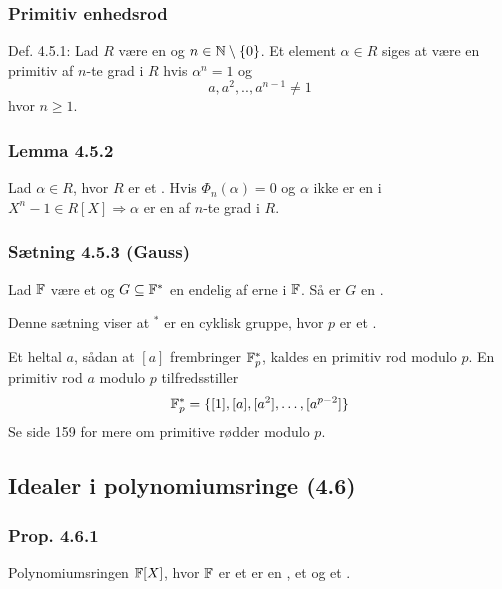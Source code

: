 \subsubsection{Primitiv enhedsrod}
\label{Primitiv enhedsrod}
Def. 4.5.1: Lad $R$ være en  og $n \in \mathbb{N}\setminus \{ 0 \}$. Et
element $\alpha \in R$ siges at være en primitiv  af $n$-te grad i $R$ hvis
$\alpha^n = 1$ og
\begin{equation*}
  a,a^2,..,a^{n-1} \neq 1
\end{equation*}
hvor $n \geq 1$.

\subsubsection{Lemma 4.5.2}
\label{Lemma 4.5.2}
Lad $\alpha \in R$, hvor $R$ er et . Hvis
$\Phi_n(\alpha) = 0$ og $\alpha$ ikke er en  i $X^n - 1
\in R[X] \Rightarrow \alpha$ er en  af $n$-te grad i
$R$.

\subsubsection{Sætning 4.5.3 (Gauss)}
\label{Saetning 4.5.3 (Gauss)}
Lad $\mathbb{F}$ være et  og $G \subseteq \mathbb{F}^*$ en endelig
 af erne i $\mathbb{F}$. Så er $G$ en
.

Denne sætning viser at $^*$ er en cyklisk gruppe, hvor $p$ er
et .

Et heltal $a$, sådan at $[a]$ frembringer $\mathbb{F}_p^*$, kaldes en primitiv rod
modulo $p$. En primitiv rod $a$ modulo $p$ tilfredsstiller
\begin{equation*}
  \mathbb{F}_p^* = \{ [1], [a],[a^2],\ldots,[a^{p-2}] \}
\end{equation*}
Se side 159 for mere om primitive rødder modulo $p$.

\subsection{Idealer i polynomiumsringe (4.6)}
\label{Idealer i polynomiumsringe (4.6)}

\subsubsection{Prop. 4.6.1}
\label{Prop. 4.6.1}
Polynomiumsringen $\mathbb{F}[X]$, hvor $\mathbb{F}$ er et  er en
, et  og et
.

